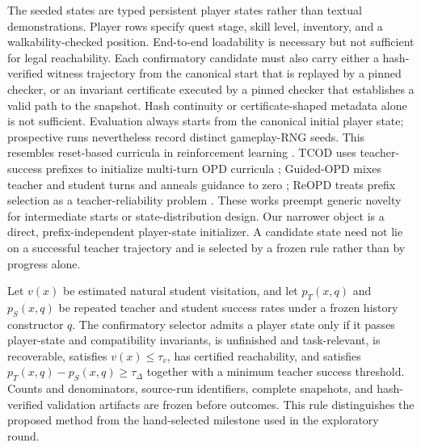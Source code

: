 \documentclass[11pt,a4paper]{article}
\begin{document}
The seeded states are typed persistent player states rather than textual demonstrations.
Player rows specify quest stage, skill level, inventory, and a walkability-checked
position. End-to-end loadability is necessary but not sufficient for legal
reachability. Each confirmatory candidate must also carry either a hash-verified
witness trajectory from the canonical start that is replayed by a pinned checker,
or an invariant certificate executed by a pinned checker that establishes a valid
path to the snapshot. Hash continuity or certificate-shaped metadata alone is not
sufficient. Evaluation always starts from the canonical initial player state;
prospective runs nevertheless record distinct gameplay-RNG seeds. This resembles reset-based curricula in reinforcement learning
\citep{salimans2018montezuma,resnick2018backplay,ecoffet2021goexplore}. TCOD
uses teacher-success prefixes to initialize multi-turn OPD curricula
\citep{wang2026tcod}; Guided-OPD mixes teacher and student turns and anneals
guidance to zero \citep{li2026guidedopd}; ReOPD treats prefix selection as a
teacher-reliability problem \citep{liao2026reopd}. These works preempt generic
novelty for intermediate starts or state-distribution design. Our narrower
object is a direct, prefix-independent player-state initializer. A candidate
state need not lie on a successful teacher trajectory and is selected by a
frozen rule rather than by progress alone.

Let $v(x)$ be estimated natural student visitation, and let $p_T(x,q)$ and
$p_S(x,q)$ be repeated teacher and student success rates under a frozen history
constructor $q$. The confirmatory selector admits a player state only if it
passes player-state and compatibility invariants, is unfinished and task-relevant, is recoverable,
satisfies $v(x)\leq\tau_v$, has certified reachability, and satisfies
$p_T(x,q)-p_S(x,q)\geq\tau_\Delta$ together with a minimum teacher
success threshold. Counts and denominators, source-run identifiers, complete
snapshots, and hash-verified validation artifacts are frozen before outcomes.
This rule distinguishes the proposed method from the hand-selected milestone
used in the exploratory round.
\end{document}
